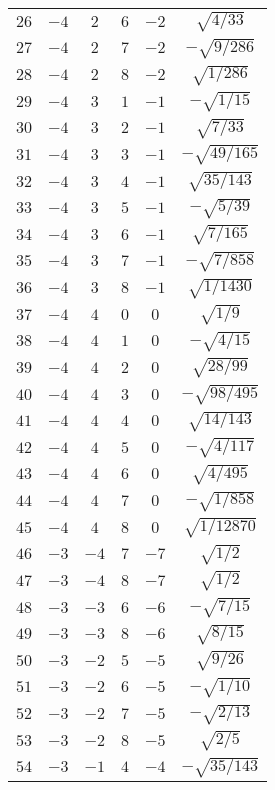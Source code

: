 \begin{table}
\begin{center}
\begin{tabular}{|c|c|c|c|c|c|}
$26$ & $-4$ & $2$ & $6$ & $-2$ & $\sqrt{4/33}$ \\ 
$27$ & $-4$ & $2$ & $7$ & $-2$ & $-\sqrt{9/286}$ \\ 
$28$ & $-4$ & $2$ & $8$ & $-2$ & $\sqrt{1/286}$ \\ 
$29$ & $-4$ & $3$ & $1$ & $-1$ & $-\sqrt{1/15}$ \\ 
$30$ & $-4$ & $3$ & $2$ & $-1$ & $\sqrt{7/33}$ \\ 
$31$ & $-4$ & $3$ & $3$ & $-1$ & $-\sqrt{49/165}$ \\ 
$32$ & $-4$ & $3$ & $4$ & $-1$ & $\sqrt{35/143}$ \\ 
$33$ & $-4$ & $3$ & $5$ & $-1$ & $-\sqrt{5/39}$ \\ 
$34$ & $-4$ & $3$ & $6$ & $-1$ & $\sqrt{7/165}$ \\ 
$35$ & $-4$ & $3$ & $7$ & $-1$ & $-\sqrt{7/858}$ \\ 
$36$ & $-4$ & $3$ & $8$ & $-1$ & $\sqrt{1/1430}$ \\ 
$37$ & $-4$ & $4$ & $0$ & $0$ & $\sqrt{1/9}$ \\ 
$38$ & $-4$ & $4$ & $1$ & $0$ & $-\sqrt{4/15}$ \\ 
$39$ & $-4$ & $4$ & $2$ & $0$ & $\sqrt{28/99}$ \\ 
$40$ & $-4$ & $4$ & $3$ & $0$ & $-\sqrt{98/495}$ \\ 
$41$ & $-4$ & $4$ & $4$ & $0$ & $\sqrt{14/143}$ \\ 
$42$ & $-4$ & $4$ & $5$ & $0$ & $-\sqrt{4/117}$ \\ 
$43$ & $-4$ & $4$ & $6$ & $0$ & $\sqrt{4/495}$ \\ 
$44$ & $-4$ & $4$ & $7$ & $0$ & $-\sqrt{1/858}$ \\ 
$45$ & $-4$ & $4$ & $8$ & $0$ & $\sqrt{1/12870}$ \\ 
$46$ & $-3$ & $-4$ & $7$ & $-7$ & $\sqrt{1/2}$ \\ 
$47$ & $-3$ & $-4$ & $8$ & $-7$ & $\sqrt{1/2}$ \\ 
$48$ & $-3$ & $-3$ & $6$ & $-6$ & $-\sqrt{7/15}$ \\ 
$49$ & $-3$ & $-3$ & $8$ & $-6$ & $\sqrt{8/15}$ \\ 
$50$ & $-3$ & $-2$ & $5$ & $-5$ & $\sqrt{9/26}$ \\ 
$51$ & $-3$ & $-2$ & $6$ & $-5$ & $-\sqrt{1/10}$ \\ 
$52$ & $-3$ & $-2$ & $7$ & $-5$ & $-\sqrt{2/13}$ \\ 
$53$ & $-3$ & $-2$ & $8$ & $-5$ & $\sqrt{2/5}$ \\ 
$54$ & $-3$ & $-1$ & $4$ & $-4$ & $-\sqrt{35/143}$ \\ 

\end{tabular}
\end{center}
\end{table}
